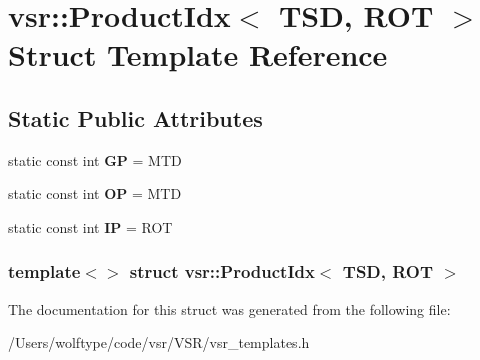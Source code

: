\hypertarget{structvsr_1_1_product_idx_3_01_t_s_d_00_01_r_o_t_01_4}{\section{vsr\-:\-:Product\-Idx$<$ T\-S\-D, R\-O\-T $>$ Struct Template Reference}
\label{structvsr_1_1_product_idx_3_01_t_s_d_00_01_r_o_t_01_4}
}
\subsection*{Static Public Attributes}
\begin{DoxyCompactItemize}
\item 
\hypertarget{structvsr_1_1_product_idx_3_01_t_s_d_00_01_r_o_t_01_4_af7ac67ea54d7be51cdac087507220e34}{static const int {\bfseries G\-P} = M\-T\-D}\label{structvsr_1_1_product_idx_3_01_t_s_d_00_01_r_o_t_01_4_af7ac67ea54d7be51cdac087507220e34}

\item 
\hypertarget{structvsr_1_1_product_idx_3_01_t_s_d_00_01_r_o_t_01_4_a4fbca27af714959b98e6ae70346248b6}{static const int {\bfseries O\-P} = M\-T\-D}\label{structvsr_1_1_product_idx_3_01_t_s_d_00_01_r_o_t_01_4_a4fbca27af714959b98e6ae70346248b6}

\item 
\hypertarget{structvsr_1_1_product_idx_3_01_t_s_d_00_01_r_o_t_01_4_ad5ea4459fe6a9f16a22c8c7f6c265d05}{static const int {\bfseries I\-P} = R\-O\-T}\label{structvsr_1_1_product_idx_3_01_t_s_d_00_01_r_o_t_01_4_ad5ea4459fe6a9f16a22c8c7f6c265d05}

\end{DoxyCompactItemize}
\subsubsection*{template$<$$>$ struct vsr\-::\-Product\-Idx$<$ T\-S\-D, R\-O\-T $>$}



The documentation for this struct was generated from the following file\-:\begin{DoxyCompactItemize}
\item 
/\-Users/wolftype/code/vsr/\-V\-S\-R/vsr\-\_\-templates.\-h\end{DoxyCompactItemize}
